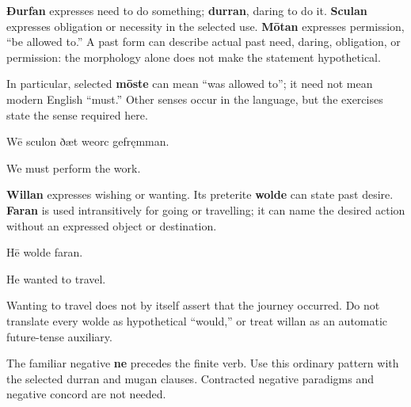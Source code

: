 \textbf{Ðurfan} expresses need to do something; \textbf{durran}, daring to do it. \textbf{Sculan} expresses obligation or necessity in the selected use. \textbf{Mōtan} expresses permission, “be allowed to.” A past form can describe actual past need, daring, obligation, or permission: the morphology alone does not make the statement hypothetical.

In particular, selected \textbf{mōste} can mean “was allowed to”; it need not mean modern English “must.” Other senses occur in the language, but the exercises state the sense required here.

Wē sculon ðæt weorc gefręmman.

We must perform the work.

\textbf{Willan} expresses wishing or wanting. Its preterite \textbf{wolde} can state past desire. \textbf{Faran} is used intransitively for going or travelling; it can name the desired action without an expressed object or destination.

Hē wolde faran.

He wanted to travel.

Wanting to travel does not by itself assert that the journey occurred. Do not translate every wolde as hypothetical “would,” or treat willan as an automatic future-tense auxiliary.

The familiar negative \textbf{ne} precedes the finite verb. Use this ordinary pattern with the selected durran and mugan clauses. Contracted negative paradigms and negative concord are not needed.

